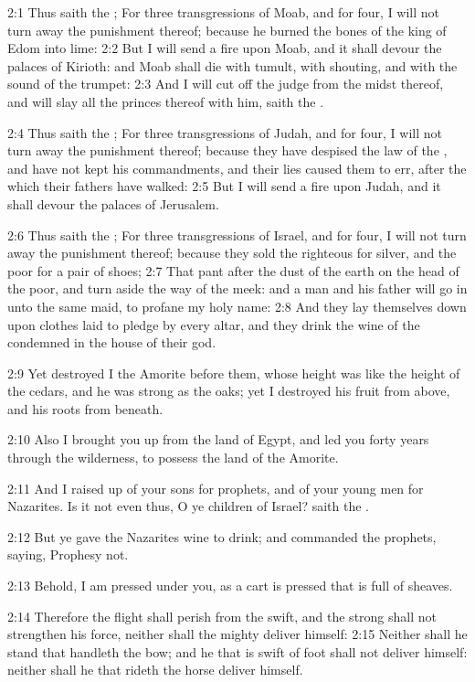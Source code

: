 2:1 Thus saith the \LORD; For three transgressions of Moab, and for four, I will not turn away the punishment thereof; because he burned the bones of the king of Edom into lime: 2:2 But I will send a fire upon Moab, and it shall devour the palaces of Kirioth: and Moab shall die with tumult, with shouting, and with the sound of the trumpet: 2:3 And I will cut off the judge from the midst thereof, and will slay all the princes thereof with him, saith the \LORD.

2:4 Thus saith the \LORD; For three transgressions of Judah, and for four, I will not turn away the punishment thereof; because they have despised the law of the \LORD, and have not kept his commandments, and their lies caused them to err, after the which their fathers have walked: 2:5 But I will send a fire upon Judah, and it shall devour the palaces of Jerusalem.

2:6 Thus saith the \LORD; For three transgressions of Israel, and for four, I will not turn away the punishment thereof; because they sold the righteous for silver, and the poor for a pair of shoes; 2:7 That pant after the dust of the earth on the head of the poor, and turn aside the way of the meek: and a man and his father will go in unto the same maid, to profane my holy name: 2:8 And they lay themselves down upon clothes laid to pledge by every altar, and they drink the wine of the condemned in the house of their god.

2:9 Yet destroyed I the Amorite before them, whose height was like the height of the cedars, and he was strong as the oaks; yet I destroyed his fruit from above, and his roots from beneath.

2:10 Also I brought you up from the land of Egypt, and led you forty years through the wilderness, to possess the land of the Amorite.

2:11 And I raised up of your sons for prophets, and of your young men for Nazarites. Is it not even thus, O ye children of Israel? saith the \LORD.

2:12 But ye gave the Nazarites wine to drink; and commanded the prophets, saying, Prophesy not.

2:13 Behold, I am pressed under you, as a cart is pressed that is full of sheaves.

2:14 Therefore the flight shall perish from the swift, and the strong shall not strengthen his force, neither shall the mighty deliver himself: 2:15 Neither shall he stand that handleth the bow; and he that is swift of foot shall not deliver himself: neither shall he that rideth the horse deliver himself.

